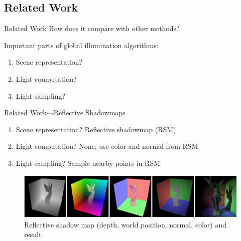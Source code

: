 \documentclass[10pt]{beamer}
\begin{document}
\subsection{Related Work}
\begin{frame}{Related Work}
  How does it compare with other methods?
  \vspace{1cm}

  Important parts of global illumination algorithms:
  \begin{enumerate}
    \item Scene representation? %
    \item Light computation? %
    \item Light sampling? %
  \end{enumerate}
\end{frame}

{
\begin{frame}{Related Work---Reflective Shadowmaps}
  \begin{enumerate}
    \item Scene representation? \alert{Reflective shadowmap (RSM)}%
    \item Light computation? \alert{None, use color and normal from RSM}%
    \item Light sampling? \alert{Sample nearby points in RSM} %
  \end{enumerate}

  \begin{figure}
    \includegraphics[width=\textwidth]{rsm}
    \caption*{Reflective shadow map (depth, world position, normal, color) and result}
  \end{figure}

\end{frame}}
\end{document}
